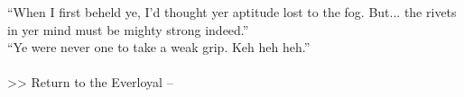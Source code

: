 “When I first beheld ye, I’d thought yer aptitude lost to the fog. But... the rivets in yer mind must be mighty strong indeed.”\\

“Ye were never one to take a weak grip. Keh heh heh.”\\
\\

>>  Return to the Everloyal -- 